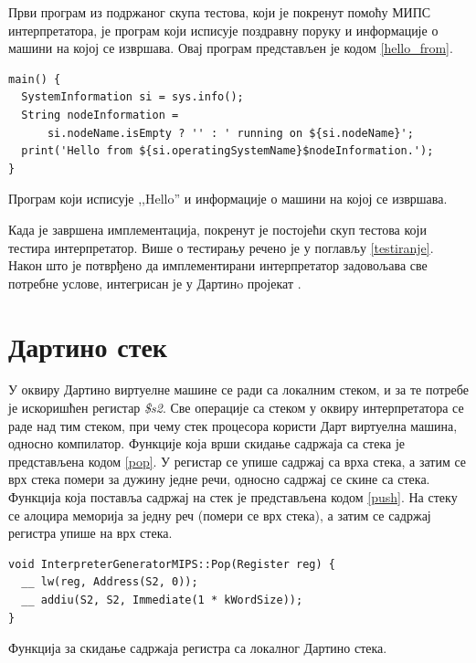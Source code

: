 \documentclass[12pt,oneside]{memoir}
\begin{document}
Први програм из подржаног скупа тестова, који је покренут помоћу МИПС интерпретатора, је  програм који исписује поздравну поруку и информације о машини на којој се извршава. Овај програм представљен је кодом \ref{hello_from}.\\

\begin{listing}
\begin{verbatim}
main() {
  SystemInformation si = sys.info();
  String nodeInformation =
      si.nodeName.isEmpty ? '' : ' running on ${si.nodeName}';
  print('Hello from ${si.operatingSystemName}$nodeInformation.');
}
\end{verbatim}
\caption{Програм који исписује ,,Hello'' и информације о машини на којој се извршава.}
\label{hello_from}
\end{listing}
Када је завршена имплементација, покренут је постојећи скуп тестова који тестира интерпретатор. Више о тестирању речено је у поглављу \ref{testiranje}. Након што је потврђено да имплементирани интерпретатор задовољава све потребне услове, интегрисан је у Дартинo пројекат \cite{interpreterMips}.


\section{Дартино стек}
\label{sec:stek}

У оквиру Дартино виртуелне машине се ради са локалним стеком, и за те потребе је искоришћен регистар \textit{\$s2}. Све операције са стеком у оквиру интерпретатора се раде над тим стеком, при чему стек процесора користи Дарт виртуелна машина, односно компилатор.
Функције која врши скидање садржаја са стека је представљена кодом \ref{pop}. У регистар се упише садржај са врха стека, а затим се врх стека помери за дужину једне речи, односно садржај се скине са стека.
Функција која поставља садржај на стек је представљена кодом \ref{push}. На стеку се алоцира меморија за једну реч (помери се врх стека), а затим се садржај регистра упише на врх стека.\\

\begin{listing}
\begin{verbatim}
void InterpreterGeneratorMIPS::Pop(Register reg) {
  __ lw(reg, Address(S2, 0));
  __ addiu(S2, S2, Immediate(1 * kWordSize));
}
\end{verbatim}
\caption{Функција за скидање садржаја регистра са локалног Дартино стека.}
\label{pop}
\end{listing}
\end{document}
